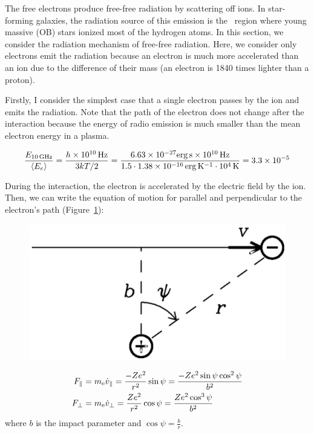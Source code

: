 The free electrons produce free-free radiation by scattering off ions.
In star-forming galaxies, the radiation source of this emission is the \ih~region where young massive (OB) stars ionized most of the hydrogen atoms.
In this section, we consider the radiation mechanism of free-free radiation.
Here, we consider only electrons emit the radiation because an electron is much more accelerated than an ion due to the difference of their mass (an electron is 1840 times lighter than a proton).

Firstly, I consider the simplest case that a single electron passes by the ion and emits the radiation.
Note that the path of the electron does not change after the interaction because the energy of radio emission is much smaller than the mean electron energy in a plasma.

\begin{equation}\label{eq:essential_radio4n12}
    \frac{E_{\mathrm{10\,\mathrm{GHz}}}}{\langle E_e \rangle} = \frac{h \times 10^{10}\,\mathrm{Hz}}{3kT / 2} = \frac{6.63 \times 10^{-27} \mathrm{erg\,s} \times 10^{10}\,\mathrm{Hz}}{1.5 \cdot 1.38 \times 10^{-16}\,\mathrm{erg\,K^{-1}} \cdot 10^4\,\mathrm{K}} = 3.3 \times 10^{-5}
\end{equation}

During the interaction, the electron is accelerated by the electric field by the ion.
Then, we can write the equation of motion for parallel and perpendicular to the electron's path (Figure~\ref{fig:nrao_radio4n2}):

\begin{figure}[htbp]
	\centering
	\includegraphics[width=.5\linewidth]{Chapter_2/Figures/NRAO_radio4n2.png}
    \caption[The schematic image of the interaction of an electron with the ion]{\label{fig:nrao_radio4n2}
    }
\end{figure}

\begin{align}
    F_{\|} &= m_{\mathrm{e}} \dot{v}_{\|}=\frac{-Z e^{2}}{r^{2}} \sin \psi=\frac{-Z e^{2} \sin \psi \cos ^{2} \psi}{b^{2}}\label{eq:essential_radio4n15}\\
    F_{\perp} &= m_{\mathrm{e}} \dot{v}_{\perp}=\frac{Z e^{2}}{r^{2}} \cos \psi=\frac{Z e^{2} \cos ^{3} \psi}{b^{2}}\label{eq:essential_radio4n16}
\end{align}
where $b$ is the impact parameter and $\cos\psi = \frac{b}{r}$.

